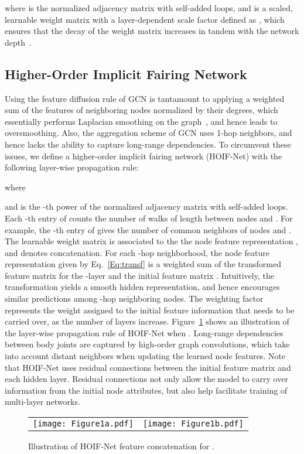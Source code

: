 \documentclass{bmvc2k}
\begin{document}
where  is the normalized adjacency matrix with self-added loops, and  is a scaled, learnable weight matrix with a layer-dependent scale factor defined as , which ensures that the decay of the weight matrix increases in tandem with the network depth~\cite{chen2020simple}.


\subsection{Higher-Order Implicit Fairing Network}
Using the feature diffusion rule of GCN is tantamount to applying a weighted sum of the features of neighboring nodes normalized by their degrees, which essentially performs Laplacian smoothing on the graph~\cite{Li:18}, and hence leads to oversmoothing. Also, the aggregation scheme of GCN uses 1-hop neighbors, and hence lacks the ability to capture long-range dependencies. To circumvent these issues, we define a higher-order implicit fairing network (HOIF-Net) with the following layer-wise propagation rule:

where

and  is the -th power of the normalized adjacency matrix with self-added loops. Each -th entry of  counts the number of walks of length  between nodes  and . For example, the -th entry of  gives the number of common neighbors of nodes  and . The learnable weight matrix  is associated to the the node feature representation , and  denotes concatenation. For each -hop neighborhood, the node feature representation  given by Eq.~\eqref{Eq:transf} is a weighted sum of the transformed feature matrix  for the -layer and the initial feature matrix . Intuitively, the transformation  yields a smooth hidden representation, and hence encourages similar predictions among -hop neighboring nodes. The weighting factor  represents the weight assigned to the initial feature information that needs to be carried over, as the number of layers increase. Figure~\ref{Fig:humangraph2} shows an illustration of the layer-wise propagation rule of HOIF-Net when . Long-range dependencies between body joints are captured by high-order graph convolutions, which take into account distant neighbors when updating the learned node features. Note that HOIF-Net uses residual connections between the initial feature matrix and each hidden layer. Residual connections not only allow the model to carry over information from the initial node attributes, but also help facilitate training of multi-layer networks.

\begin{figure}[!htb]
\setlength{\tabcolsep}{1em}
\centering
\begin{tabular}{cc}
\texttt{[image: Figure1a.pdf]} &
\texttt{[image: Figure1b.pdf]}
\end{tabular}
\caption{Illustration of HOIF-Net feature concatenation for .}
\label{Fig:humangraph2}
\end{figure}
\end{document}

